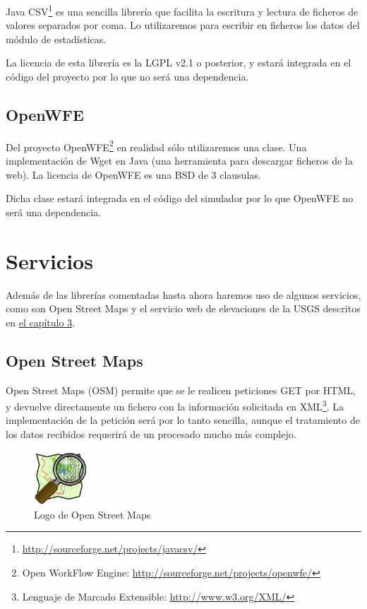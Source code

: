 Java CSV\footnote{\url{http://sourceforge.net/projects/javacsv/}} es una
sencilla librería que facilita la escritura y lectura de ficheros de valores
separados por coma. Lo utilizaremos para escribir en ficheros los datos del
módulo de estadísticas.

La licencia de esta librería es la LGPL v2.1 o posterior, y estará integrada en
el código del proyecto por lo que no será una dependencia.

\subsection{OpenWFE}

Del proyecto OpenWFE\footnote{Open WorkFlow Engine:
\url{http://sourceforge.net/projects/openwfe/}} en realidad sólo utilizaremos
una clase. Una implementación de Wget en Java (una herramienta para descargar
ficheros de la web). La licencia de OpenWFE es una BSD de 3 clausulas.

Dicha clase estará integrada en el código del simulador por lo que OpenWFE no
será una dependencia.

\section{Servicios}

Además de las librerías comentadas hasta ahora haremos uso de algunos
servicios, como son Open Street Maps y el servicio web de elevaciones de la
USGS descritos en \hyperref[cap3]{el capítulo 3}.

\subsection{Open Street Maps}

Open Street Maps (OSM)\cite{Pinto09} permite que se le realicen peticiones GET
por HTML, y
devuelve directamente un fichero con la información solicitada en
XML\footnote{Lenguaje de Marcado Extensible: \url{http://www.w3.org/XML/}}. La
implementación de la petición será por lo tanto sencilla, aunque el tratamiento
de los datos recibidos requerirá de un procesado mucho más complejo.

\begin{figure}[H]
 \centering
 \includegraphics[width=20mm]{figuras/cap4/osm.png}
 \caption{Logo de Open Street Maps}
\end{figure}

